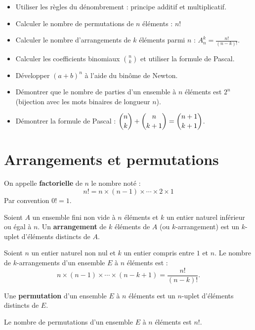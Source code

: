 \documentclass[11pt,a4paper,openany]{book}
\theoremstyle{definition}
\begin{document}
    \begin{capacitesbox}
    \begin{itemize}
        \item Utiliser les règles du dénombrement : principe additif et multiplicatif.
        \item Calculer le nombre de permutations de $n$ éléments : $n!$
        \item Calculer le nombre d'arrangements de $k$ éléments parmi $n$ : $A_n^k=\frac{n!}{(n-k)!}$.
        \item Calculer les coefficients binomiaux $\binom{n}{k}$ et utiliser la formule de Pascal.
        \item Développer $(a+b)^n$ à l'aide du binôme de Newton.
    \end{itemize}
    \end{capacitesbox}

    \begin{demoprogbox}
    \begin{itemize}
        \item Démontrer que le nombre de parties d'un ensemble à $n$ éléments est $2^n$
              (bijection avec les mots binaires de longueur $n$).
        \item Démontrer la formule de Pascal :
              $\dbinom{n}{k}+\dbinom{n}{k+1}=\dbinom{n+1}{k+1}$.
    \end{itemize}
    \end{demoprogbox}

    \section{Arrangements et permutations}
    \begin{Définition}
        On appelle \textbf{factorielle} de $n$ le nombre noté :
        \[n!=n\times(n-1)\times\cdots\times 2\times 1\]
        Par convention $0!=1$.
    \end{Définition}
    \begin{Définition}
        Soient $A$ un ensemble fini non vide à $n$ éléments et $k$ un entier naturel
        inférieur ou égal à $n$. Un \textbf{arrangement} de $k$ éléments de $A$ (ou
        $k$-arrangement) est un $k$-uplet d'éléments distincts de $A$.
    \end{Définition}
    \begin{Propriété}
        Soient $n$ un entier naturel non nul et $k$ un entier compris entre $1$ et $n$.
        Le nombre de $k$-arrangements d'un ensemble $E$ à $n$ éléments est :
        \[n\times(n-1)\times\cdots\times(n-k+1)=\frac{n!}{(n-k)!}.\]
    \end{Propriété}
    \begin{Définition}
        Une \textbf{permutation} d'un ensemble $E$ à $n$ éléments est un $n$-uplet
        d'éléments distincts de $E$.
    \end{Définition}
    \begin{Propriété}
        Le nombre de permutations d'un ensemble $E$ à $n$ éléments est $n!$.
    \end{Propriété}
\end{document}
